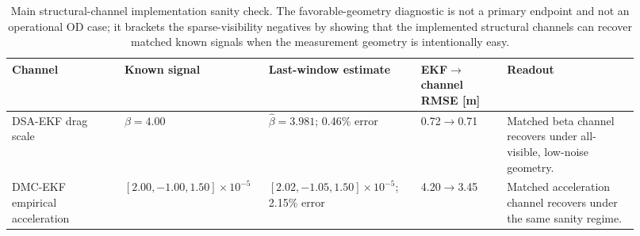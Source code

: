 \begin{table}[t]
  \centering\scriptsize
  \caption{Main structural-channel implementation sanity check. The favorable-geometry diagnostic is not a primary endpoint and not an operational OD case; it brackets the sparse-visibility negatives by showing that the implemented structural channels can recover matched known signals when the measurement geometry is intentionally easy.}
  \label{tab:main_structural_recoverability}
  \begingroup\setlength{\tabcolsep}{3pt}
  \begin{tabular}{@{}p{0.17\linewidth}p{0.19\linewidth}p{0.23\linewidth}p{0.13\linewidth}p{0.20\linewidth}@{}}
    \toprule
    Channel & Known signal & Last-window estimate & EKF$\to$channel RMSE [m] & Readout \\
    \midrule
    DSA-EKF drag scale & $\beta=4.00$ & $\hat\beta=3.981$; 0.46\% error & 0.72$\to$0.71 & Matched beta channel recovers under all-visible, low-noise geometry. \\
    DMC-EKF empirical acceleration & $[2.00, -1.00, 1.50]\times10^{-5}$ & $[2.02, -1.05, 1.50]\times10^{-5}$; 2.15\% error & 4.20$\to$3.45 & Matched acceleration channel recovers under the same sanity regime. \\
    \bottomrule
  \end{tabular}
  \endgroup
\end{table}